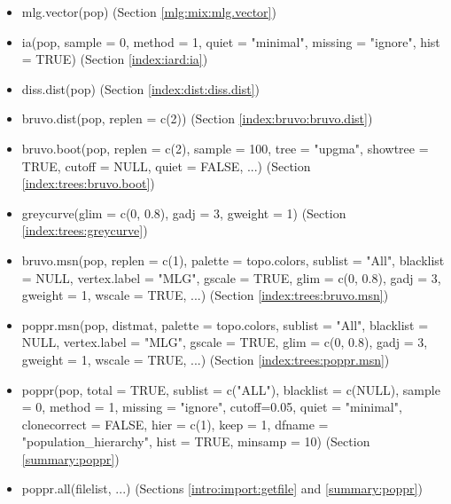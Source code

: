 \documentclass[letterpaper]{article}
\begin{document}
\begin{itemize}
\item mlg.vector(pop) (Section \ref{mlg:mix:mlg.vector})
\item ia(pop, sample = 0, method = 1, quiet = "minimal", missing = "ignore", hist = TRUE) (Section \ref{index:iard:ia})
\item diss.dist(pop) (Section \ref{index:dist:diss.dist})
\item bruvo.dist(pop, replen = c(2)) (Section \ref{index:bruvo:bruvo.dist})
\item bruvo.boot(pop, replen = c(2), sample = 100, tree = "upgma", showtree = TRUE, 
cutoff = NULL, quiet = FALSE, ...)  (Section \ref{index:trees:bruvo.boot})
\item greycurve(glim = c(0, 0.8), gadj = 3, gweight = 1) (Section \ref{index:trees:greycurve})
\item bruvo.msn(pop, replen = c(1), palette = topo.colors, sublist = "All", blacklist = NULL, vertex.label = "MLG", gscale = TRUE, glim = c(0, 0.8), gadj = 3, gweight = 1, wscale = TRUE, ...) (Section \ref{index:trees:bruvo.msn})
\item poppr.msn(pop, distmat, palette = topo.colors, sublist = "All", blacklist = NULL, vertex.label = "MLG", gscale = TRUE, glim = c(0, 0.8), gadj = 3, gweight = 1, wscale = TRUE, ...) (Section \ref{index:trees:poppr.msn})
\item poppr(pop, total = TRUE, sublist = c("ALL"), blacklist = c(NULL), sample = 0, method = 1, missing = "ignore", cutoff=0.05, quiet = "minimal", clonecorrect = FALSE, hier = c(1), keep = 1, dfname = "population\_hierarchy", hist = TRUE, minsamp = 10) (Section \ref{summary:poppr})
\item poppr.all(filelist, ...) (Sections \ref{intro:import:getfile} and \ref{summary:poppr})
\end{itemize}
\normalsize


\end{document}
